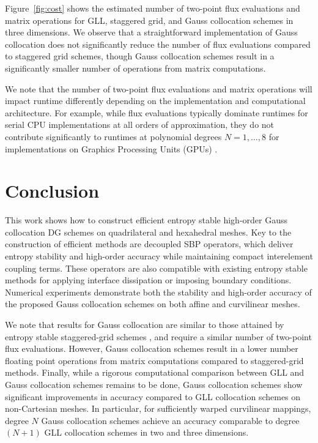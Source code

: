 \documentclass[review,onefignum,onetabnum,final]{siamart171218}
\newcommand{\note}[1]{{\color{blue}{#1}}}
\begin{document}
Figure~\ref{fig:cost} shows the estimated number of two-point flux evaluations and matrix operations for GLL, staggered grid, and Gauss collocation schemes in three dimensions.  We observe that a straightforward implementation of Gauss collocation does not significantly reduce the number of flux evaluations compared to staggered grid schemes, though Gauss collocation schemes result in a  significantly smaller number of operations from matrix computations.  

We note that the number of two-point flux evaluations and matrix operations will impact runtime differently depending on the implementation and computational architecture.  For example, while flux evaluations typically dominate runtimes for serial CPU implementations at all orders of approximation, they do not contribute significantly to runtimes at polynomial degrees $N=1,\ldots, 8$ for implementations on Graphics Processing Units (GPUs) \cite{wintermeyer2018entropy}.  

\section{Conclusion}

This work shows how to construct efficient entropy stable high-order Gauss collocation DG schemes on quadrilateral and hexahedral meshes.  Key to the construction of efficient methods are decoupled SBP operators, which deliver entropy stability and high-order accuracy while maintaining compact interelement coupling terms.  These operators are also compatible with existing entropy stable methods for applying interface dissipation \cite{winters2017uniquely} or imposing boundary conditions.  Numerical experiments demonstrate both the stability and high-order accuracy of the proposed Gauss collocation schemes on both affine and curvilinear meshes.  \note{We note that, while the numerical experiments presented here consider only mapped Cartesian domains, the method is also applicable to complex geometries, and future work will focus on studying the performance of such methods on curvilinear quadrilateral and hexahedral unstructured meshes.}

We note that results for Gauss collocation are similar to those attained by entropy stable staggered-grid schemes \cite{parsani2016entropy}, and require a similar number of two-point flux evaluations.  However, Gauss collocation schemes result in a lower number floating point operations from matrix computations compared to staggered-grid methods.  Finally, while a rigorous computational comparison between GLL and Gauss collocation schemes remains to be done, Gauss collocation schemes show significant improvements in accuracy compared to GLL collocation schemes on non-Cartesian meshes.  In particular, for sufficiently warped curvilinear mappings, degree $N$ Gauss collocation schemes achieve an accuracy comparable to degree $(N+1)$ GLL collocation schemes in two and three dimensions.  
\end{document}
